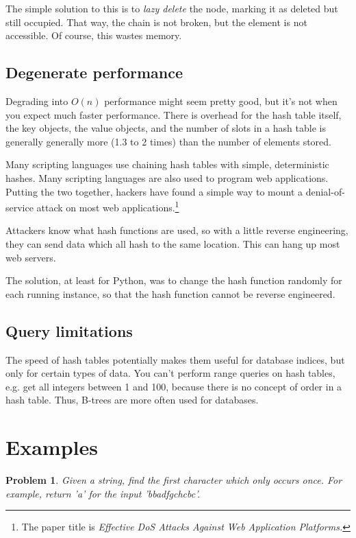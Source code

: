 \documentclass{article}
\newtheorem{problem}{Problem}
\begin{document}
The simple solution to this is to \textit{lazy delete} the node, marking it as deleted but still occupied.  That way, the chain is not broken, but the element is not accessible.  Of course, this wastes memory.

\subsection{Degenerate performance}
Degrading into $O(n)$ performance might seem pretty good, but it's not when you expect much faster performance.  There is overhead for the hash table itself, the key objects, the value objects, and the number of slots in a hash table is generally generally more (1.3 to 2 times) than the number of elements stored.

Many scripting languages use chaining hash tables with simple, deterministic hashes.  Many scripting languages are also used to program web applications.  Putting the two together, hackers have found a simple way to mount a denial-of-service attack on most web applications.\footnote{The paper title is \textit{Effective DoS Attacks Against Web Application Platforms.}}

Attackers know what hash functions are used, so with a little reverse engineering, they can send data which all hash to the same location.  This can hang up most web servers.

The solution, at least for Python, was to change the hash function randomly for each running instance, so that the hash function cannot be reverse engineered.

\subsection{Query limitations}
The speed of hash tables potentially makes them useful for database indices, but only for certain types of data.  You can't perform range queries on hash tables, e.g. get all integers between 1 and 100, because there is no concept of order in a hash table.  Thus, B-trees are more often used for databases.

\section{Examples}
\begin{problem}
{Given a string, find the first character which only occurs once.  For example, return 'a' for the input 'bbadfgchcbc'.}
\end{problem}
\end{document}
